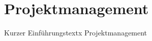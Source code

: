 \documentclass[main.tex]{subfiles} %
\begin{document}

\section{Projektmanagement}

Kurzer Einführungstextx Projektmanagement


\newpage


\newpage


\newpage


\newpage
\end{document}
